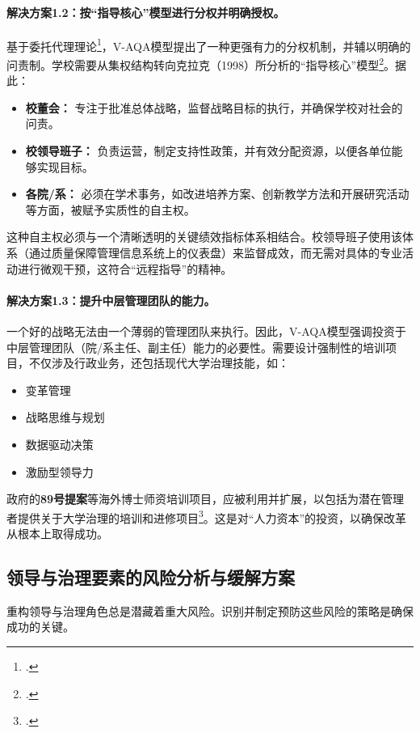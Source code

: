 \paragraph{解决方案1.2：按“指导核心”模型进行分权并明确授权。}
基于委托代理理论\footcite{JensenMeckling1976}，V-AQA模型提出了一种更强有力的分权机制，并辅以明确的问责制。学校需要从集权结构转向克拉克（1998）所分析的“指导核心”模型\footcite{clark_1998}。据此：
\begin{itemize}
    \item \textbf{校董会：} 专注于批准总体战略，监督战略目标的执行，并确保学校对社会的问责。
    \item \textbf{校领导班子：} 负责运营，制定支持性政策，并有效分配资源，以便各单位能够实现目标。
    \item \textbf{各院/系：} 必须在学术事务，如改进培养方案、创新教学方法和开展研究活动等方面，被赋予实质性的自主权。
\end{itemize}
这种自主权必须与一个清晰透明的关键绩效指标体系相结合。校领导班子使用该体系（通过质量保障管理信息系统上的仪表盘）来监督成效，而无需对具体的专业活动进行微观干预，这符合“远程指导”的精神。

\paragraph{解决方案1.3：提升中层管理团队的能力。}
一个好的战略无法由一个薄弱的管理团队来执行。因此，V-AQA模型强调投资于中层管理团队（院/系主任、副主任）能力的必要性。需要设计强制性的培训项目，不仅涉及行政业务，还包括现代大学治理技能，如：
\begin{itemize}
    \item 变革管理
    \item 战略思维与规划
    \item 数据驱动决策
    \item 激励型领导力
\end{itemize}
政府的\textbf{89号提案}等海外博士师资培训项目，应被利用并扩展，以包括为潜在管理者提供关于大学治理的培训和进修项目\footcite{moet_project_89}。这是对“人力资本”的投资，以确保改革从根本上取得成功。

\subsection{领导与治理要素的风险分析与缓解方案}
\label{subsec:risk_lanhdao}
重构领导与治理角色总是潜藏着重大风险。识别并制定预防这些风险的策略是确保成功的关键。

